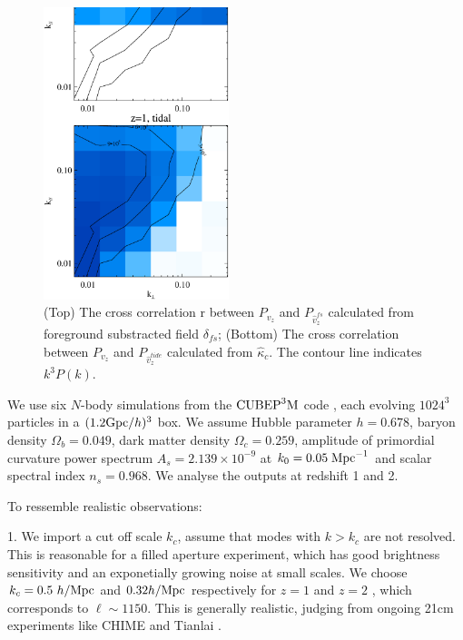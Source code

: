 \begin{figure}[tbp]
\begin{center}
\includegraphics[width=0.48\textwidth]{compare_powv2d_z1z2.eps}
\end{center}
\vspace{-0.7cm}
\caption{(Top) The cross correlation r between $P_{v_z}$ and 
    $P_{\hat v_z^{fs}}$ calculated from foreground substracted field $\delta_{fs}$; 
    (Bottom) The cross correlation between $P_{v_z}$ and $P_{\hat v_z^{tide}}$ calculated from $\hat \kappa_c$. 
The contour line indicates $k^3 P(k)$.
}
\label{fig:v}
\end{figure}
We use six $N$-body simulations from the
$\mathrm{CUBEP}^3\mathrm{M}$ code \cite{2013:code}, each evolving $1024^3$ particles in a $(1.2\mathrm{Gpc}/h)^3$ box. 
We assume Hubble parameter $h=0.678$, baryon
density $\Omega_{b}=0.049$, dark matter density $\Omega_{c}=0.259$,
amplitude of primordial curvature power spectrum $A_s=2.139\times10^{-9}$ at 
$k_0=0.05\;\mathrm{Mpc}^{-1}$ and scalar spectral index $n_s=0.968$.
We analyse the outputs at redshift 1 and 2.

To ressemble realistic observations:

1. We import a cut off scale $k_c$, assume that modes with $k>k_c$ are not resolved.
This is reasonable for a filled aperture experiment, which
has good brightness sensitivity and an exponetially growing noise at small 
scales.
We choose $k_c=0.5\ h/\mr{Mpc}$ and $0.32 h/\mathrm{Mpc}$ respectively for $z=1$ and $z=2$ , which corresponds
to $\ell\sim1150$. 
This is generally realistic, judging from ongoing 21cm experiments like
CHIME \cite{2014SPIE.9145E..22B}\cite{2014SPIE.9145E..4VN}
and Tianlai \cite{2012IJMPS..12..256C}\cite{2015ApJ...798...40X}.

